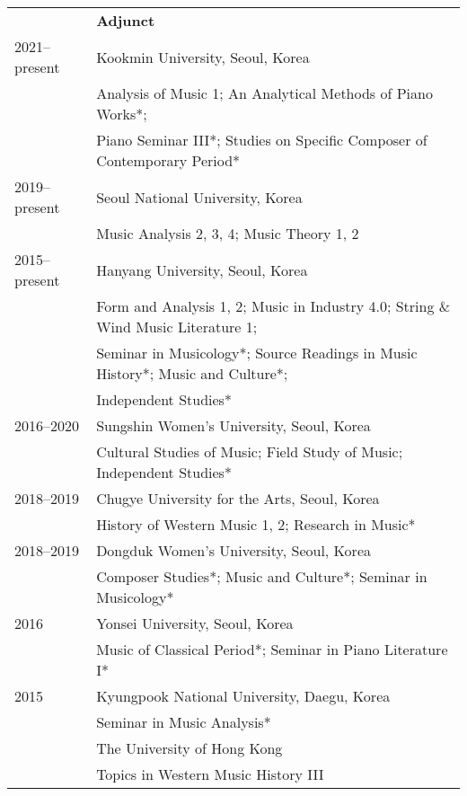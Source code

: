 \documentclass[letter,11pt,draft]{article}
\begin{document}
  \begin{tabular}{p{2.5cm} l}
    & \textbf{Adjunct}\\
    2021–present & Kookmin University, Seoul, Korea\\
    & Analysis of Music 1; An Analytical Methods of Piano Works*;\\
    & Piano Seminar III*; Studies on Specific Composer of Contemporary Period*\\[1mm]
    
    2019–present & Seoul National University, Korea\\
    & Music Analysis 2, 3, 4; Music Theory 1, 2\\[1mm]
    
    2015–present & Hanyang University, Seoul, Korea\\
    & Form and Analysis 1, 2; Music in Industry 4.0; String \& Wind Music Literature 1;\\
    & Seminar in Musicology*; Source Readings in Music History*; Music and Culture*;\\
    & Independent Studies*\\[1mm]
    
    2016–2020 & Sungshin Women's University, Seoul, Korea\\
    & Cultural Studies of Music; Field Study of Music; Independent Studies*\\[1mm]
    
    2018–2019 & Chugye University for the Arts, Seoul, Korea\\
    & History of Western Music 1, 2; Research in Music*\\[1mm]
    
    2018–2019 & Dongduk Women's University, Seoul, Korea\\
    & Composer Studies*; Music and Culture*; Seminar in Musicology*\\[1mm]
    
    2016 & Yonsei University, Seoul, Korea\\
    & Music of Classical Period*; Seminar in Piano Literature I*\\[1mm]
    
    2015 & Kyungpook National University, Daegu, Korea\\
    & Seminar in Music Analysis*\\[1mm]
    
    & The University of Hong Kong\\
    & Topics in Western Music History III\\[1mm]
  \end{tabular}
    
\end{document}

